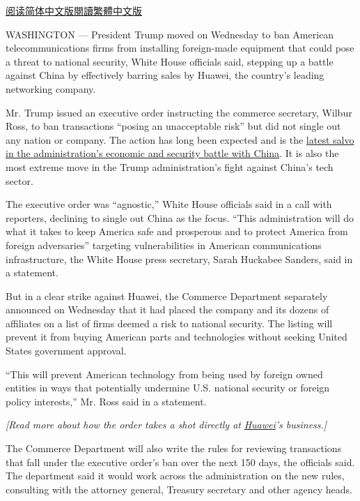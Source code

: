\href{https://cn.nytimes.com/business/20190516/huawei-ban-trump/}{阅读简体中文版}\href{https://cn.nytimes.com/business/20190516/huawei-ban-trump/zh-hant/}{閱讀繁體中文版}

WASHINGTON --- President Trump moved on Wednesday to ban American
telecommunications firms from installing foreign-made equipment that
could pose a threat to national security, White House officials said,
stepping up a battle against China by effectively barring sales by
Huawei, the country's leading networking company.

Mr. Trump issued an executive order instructing the commerce secretary,
Wilbur Ross, to ban transactions ``posing an unacceptable risk'' but did
not single out any nation or company. The action has long been expected
and is the
\href{https://www.nytimes.com/2019/01/26/us/politics/huawei-china-us-5g-technology.html}{latest
salvo in the administration's economic and security battle with China}.
It is also the most extreme move in the Trump administration's fight
against China's tech sector.

The executive order was ``agnostic,'' White House officials said in a
call with reporters, declining to single out China as the focus. ``This
administration will do what it takes to keep America safe and prosperous
and to protect America from foreign adversaries'' targeting
vulnerabilities in American communications infrastructure, the White
House press secretary, Sarah Huckabee Sanders, said in a statement.

But in a clear strike against Huawei, the Commerce Department separately
announced on Wednesday that it had placed the company and its dozens of
affiliates on a list of firms deemed a risk to national security. The
listing will prevent it from buying American parts and technologies
without seeking United States government approval.

``This will prevent American technology from being used by foreign owned
entities in ways that potentially undermine U.S. national security or
foreign policy interests,'' Mr. Ross said in a statement.

\emph{{[}Read more about how the order takes a shot directly at}
\href{https://www.nytimes.com/2019/05/16/technology/huawei-ban-president-trump.html}{\emph{Huawei}}\emph{'s
business.{]}}

The Commerce Department will also write the rules for reviewing
transactions that fall under the executive order's ban over the next 150
days, the officials said. The department said it would work across the
administration on the new rules, consulting with the attorney general,
Treasury secretary and other agency heads.

